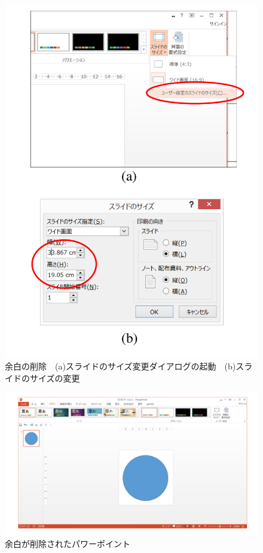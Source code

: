 \documentclass[twocolumn,a4j]{jarticle}
\begin{document}
\begin{figure}[t]
  \centering  
  \includegraphics[scale=0.4]{fig/trim_fig.pdf}
  \caption{余白の削除~~(a)スライドのサイズ変更ダイアログの起動~~(b)スライドのサイズの変更}
  \label{fig:trim_fig}
\end{figure}

\begin{figure}[t]
  \centering
  \includegraphics[scale=0.25]{fig/trim_fig2.pdf}
  \caption{余白が削除されたパワーポイント}
  \label{fig:trim_fig2}
\end{figure}
\end{document}
